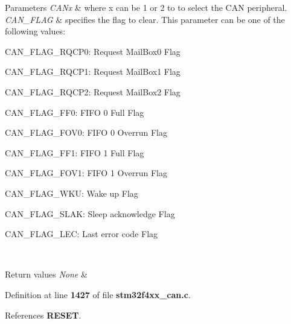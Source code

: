 \begin{DoxyParams}{Parameters}
{\em C\+A\+Nx} & where x can be 1 or 2 to to select the C\+AN peripheral. \\
\hline
{\em C\+A\+N\+\_\+\+F\+L\+AG} & specifies the flag to clear. This parameter can be one of the following values\+: \begin{DoxyItemize}
\item C\+A\+N\+\_\+\+F\+L\+A\+G\+\_\+\+R\+Q\+C\+P0\+: Request Mail\+Box0 Flag \item C\+A\+N\+\_\+\+F\+L\+A\+G\+\_\+\+R\+Q\+C\+P1\+: Request Mail\+Box1 Flag \item C\+A\+N\+\_\+\+F\+L\+A\+G\+\_\+\+R\+Q\+C\+P2\+: Request Mail\+Box2 Flag \item C\+A\+N\+\_\+\+F\+L\+A\+G\+\_\+\+F\+F0\+: F\+I\+FO 0 Full Flag \item C\+A\+N\+\_\+\+F\+L\+A\+G\+\_\+\+F\+O\+V0\+: F\+I\+FO 0 Overrun Flag \item C\+A\+N\+\_\+\+F\+L\+A\+G\+\_\+\+F\+F1\+: F\+I\+FO 1 Full Flag \item C\+A\+N\+\_\+\+F\+L\+A\+G\+\_\+\+F\+O\+V1\+: F\+I\+FO 1 Overrun Flag \item C\+A\+N\+\_\+\+F\+L\+A\+G\+\_\+\+W\+KU\+: Wake up Flag \item C\+A\+N\+\_\+\+F\+L\+A\+G\+\_\+\+S\+L\+AK\+: Sleep acknowledge Flag \item C\+A\+N\+\_\+\+F\+L\+A\+G\+\_\+\+L\+EC\+: Last error code Flag \end{DoxyItemize}
\\
\hline
\end{DoxyParams}

\begin{DoxyRetVals}{Return values}
{\em None} & \\
\hline
\end{DoxyRetVals}


Definition at line \textbf{ 1427} of file \textbf{ stm32f4xx\+\_\+can.\+c}.



References \textbf{ R\+E\+S\+ET}.


